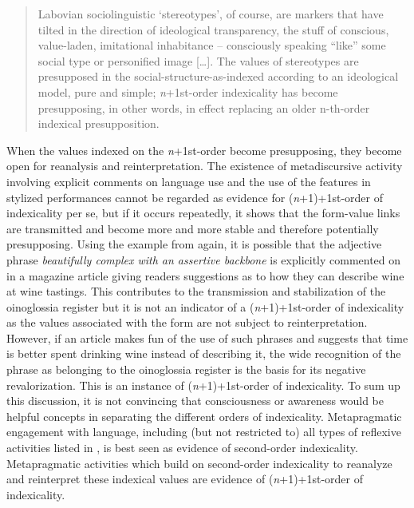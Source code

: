 \begin{quote}
Labovian sociolinguistic ‘stereotypes’, of course, are markers that have tilted in the direction of ideological transparency, the stuff of conscious, value-laden, imitational inhabitance – consciously speaking “like” some social type or personified image […]. The values of stereotypes are presupposed in the social-structure-as-indexed according to an ideological model, pure and simple; \textit{n}+1st-order indexicality has become presupposing, in other words, in effect replacing an older n-th-order indexical presupposition. \citep[220]{Silverstein2003}
\end{quote}


When the values indexed on the \emph{n}+1st-order become presupposing, they become open for reanalysis and reinterpretation. The existence of metadiscursive activity involving explicit comments on language use and the use of the features in stylized performances cannot be regarded as evidence for (\emph{n}+1)+1st-order of indexicality per se, but if it occurs repeatedly, it shows that the form-value links are transmitted and become more and more stable and therefore potentially presupposing. Using the example from  again, it is possible that the adjective phrase \emph{beautifully complex with an assertive backbone} is explicitly commented on in a magazine article giving readers suggestions as to how they can describe wine at wine tastings. This contributes to the transmission and stabilization of the oinoglossia register but it is not an indicator of a (\emph{n}+1)+1st-order of indexicality as the values associated with the form are not subject to reinterpretation. However, if an article makes fun of the use of such phrases and suggests that time is better spent drinking wine instead of describing it, the wide recognition of the phrase as belonging to the oinoglossia register is the basis for its negative revalorization. This is an instance of (\emph{n}+1)+1st-order of indexicality. To sum up this discussion, it is not convincing that consciousness or awareness would be helpful concepts in separating the different orders of indexicality. Metapragmatic engagement with language, including (but not restricted to) all types of reflexive activities listed in , is best seen as evidence of second-order indexicality. Metapragmatic activities which build on second-order indexicality to reanalyze and reinterpret these indexical values are evidence of (\emph{n}+1)+1st-order of indexicality.


